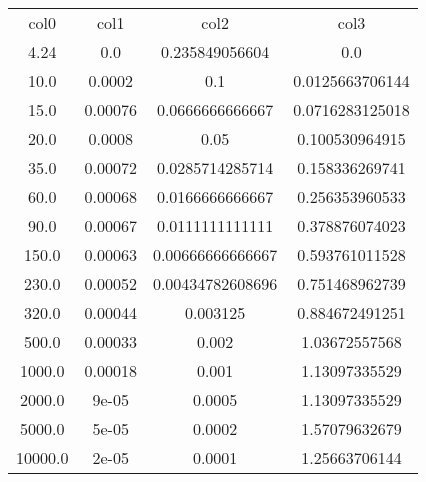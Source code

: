 \begin{table}
\begin{tabular}{cccc}
col0 & col1 & col2 & col3 \\
4.24 & 0.0 & 0.235849056604 & 0.0 \\
10.0 & 0.0002 & 0.1 & 0.0125663706144 \\
15.0 & 0.00076 & 0.0666666666667 & 0.0716283125018 \\
20.0 & 0.0008 & 0.05 & 0.100530964915 \\
35.0 & 0.00072 & 0.0285714285714 & 0.158336269741 \\
60.0 & 0.00068 & 0.0166666666667 & 0.256353960533 \\
90.0 & 0.00067 & 0.0111111111111 & 0.378876074023 \\
150.0 & 0.00063 & 0.00666666666667 & 0.593761011528 \\
230.0 & 0.00052 & 0.00434782608696 & 0.751468962739 \\
320.0 & 0.00044 & 0.003125 & 0.884672491251 \\
500.0 & 0.00033 & 0.002 & 1.03672557568 \\
1000.0 & 0.00018 & 0.001 & 1.13097335529 \\
2000.0 & 9e-05 & 0.0005 & 1.13097335529 \\
5000.0 & 5e-05 & 0.0002 & 1.57079632679 \\
10000.0 & 2e-05 & 0.0001 & 1.25663706144 \\
\end{tabular}
\end{table}
